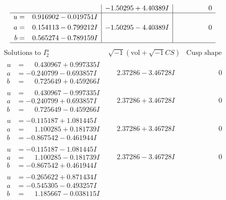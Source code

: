\documentclass[1p]{elsarticle_modified}
\theoremstyle{definition}
\newcommand{\I}{\sqrt{-1}}
\begin{document}
$$\begin{array}{c|c|c}
 & -1.50295 + 4.40389 I & \phantom{-0.000000 } 0 \\ \hline\begin{aligned}
u &= \phantom{-}0.916902 - 0.019751 I \\
a &= \phantom{-}0.154113 - 0.799212 I \\
b &= \phantom{-}0.565274 - 0.789159 I\end{aligned}
 & -1.50295 - 4.40389 I & \phantom{-0.000000 } 0\\
 \hline 
 \end{array}$$\newpage$$\begin{array}{c|c|c}  
\text{Solutions to }I^u_{2}& \I (\text{vol} + \sqrt{-1}CS) & \text{Cusp shape}\\
 \hline 
\begin{aligned}
u &= \phantom{-}0.430967 + 0.997335 I \\
a &= -0.240799 - 0.693857 I \\
b &= \phantom{-}0.725649 + 0.459266 I\end{aligned}
 & \phantom{-}2.37286 - 3.46728 I & \phantom{-0.000000 } 0 \\ \hline\begin{aligned}
u &= \phantom{-}0.430967 - 0.997335 I \\
a &= -0.240799 + 0.693857 I \\
b &= \phantom{-}0.725649 - 0.459266 I\end{aligned}
 & \phantom{-}2.37286 + 3.46728 I & \phantom{-0.000000 } 0 \\ \hline\begin{aligned}
u &= -0.115187 + 1.081445 I \\
a &= \phantom{-}1.100285 + 0.181739 I \\
b &= -0.867542 - 0.461944 I\end{aligned}
 & \phantom{-}2.37286 + 3.46728 I & \phantom{-0.000000 } 0 \\ \hline\begin{aligned}
u &= -0.115187 - 1.081445 I \\
a &= \phantom{-}1.100285 - 0.181739 I \\
b &= -0.867542 + 0.461944 I\end{aligned}
 & \phantom{-}2.37286 - 3.46728 I & \phantom{-0.000000 } 0 \\ \hline\begin{aligned}
u &= -0.265622 + 0.871434 I \\
a &= -0.545305 - 0.493257 I \\
b &= \phantom{-}1.185667 - 0.038115 I\end{aligned}

\end{array}$$
\end{document}
